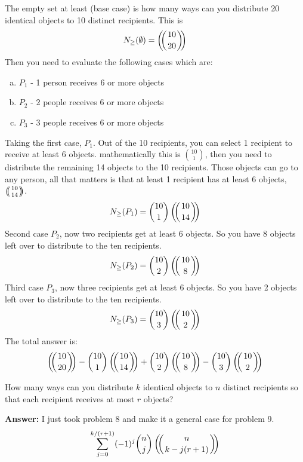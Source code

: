 \documentclass{article}
\begin{document}
The empty set at least (base case) is how many ways can you distribute 20 identical objects to 10 distinct recipients. This is
\begin{equation*}
    N_{\ge}(\emptyset) = \multiset{10}{20}
\end{equation*}
Then you need to evaluate the following cases which are:
\begin{enumerate}[(a)]
    \item $P_1$ - 1 person receives 6 or more objects
    \item $P_2$ - 2 people receives 6 or more objects
    \item $P_3$ - 3 people receives 6 or more objects
\end{enumerate}
Taking the first case, $P_1$. Out of the 10 recipients, you can select 1 recipient to receive at least 6 objects. mathematically this is $\binom{10}{1}$, then you need to distribute the remaining 14 objects to the 10 recipients. Those objects can go to any person, all that matters is that at least 1 recipient has at least 6 objects, $\multiset{10}{14}$.
\begin{equation*}
    N_{\ge}(P_1) = \binom{10}{1} \multiset{10}{14}
\end{equation*}
Second case $P_2$, now two recipients get at least 6 objects. So you have 8 objects left over to distribute to the ten recipients.
\begin{equation*}
    N_{\ge}(P_2) = \binom{10}{2} \multiset{10}{8}
\end{equation*}
Third case $P_3$, now three recipients get at least 6 objects. So you have 2 objects left over to distribute to the ten recipients.
\begin{equation*}
    N_{\ge}(P_3) = \binom{10}{3} \multiset{10}{2}
\end{equation*}
The total answer is:
\begin{equation*}
    \multiset{10}{20} - \binom{10}{1} \multiset{10}{14} + \binom{10}{2} \multiset{10}{8} - \binom{10}{3} \multiset{10}{2}
\end{equation*}

\begin{problem} %
How many ways can you distribute $k$ identical objects to $n$ distinct recipients so that each recipient receives at most $r$ objects?
\end{problem}

\textbf{Answer:} I just took problem 8 and make it a general case for problem 9.
\begin{equation*}
    \sum_{j=0}^{k/(r+1)} (-1)^j \binom{n}{j} \multiset{n}{k-j(r+1)} 
\end{equation*}
\end{document}
